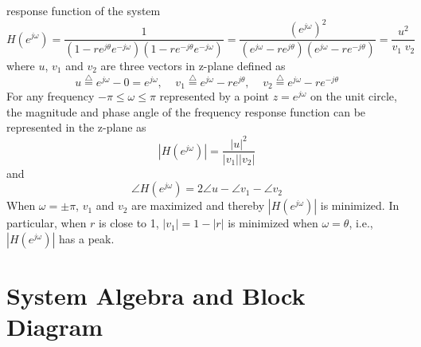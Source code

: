 response function of the system
\[
H(e^{j\omega})=\frac{1}{(1-re^{j\theta}e^{-j\omega})(1-re^{-j\theta}e^{-j\omega})}
=\frac{(e^{j\omega})^2}{(e^{j\omega}-re^{j\theta})(e^{j\omega}-re^{-j\theta})}	
=\frac{u^2}{v_1 \; v_2}	\]
where $u$, $v_1$ and $v_2$ are three vectors in z-plane defined as
\[ 	u\stackrel{\triangle}{=}e^{j\omega}-0=e^{j\omega},
\;\;\;\;v_1\stackrel{\triangle}{=}e^{j\omega}-re^{j\theta},
\;\;\;\;v_2\stackrel{\triangle}{=}e^{j\omega}-re^{-j\theta}
\]
For any frequency $-\pi \le\omega\le\pi$ represented by a point $z=e^{j\omega}$
on the unit circle, the magnitude and phase angle of the frequency response
function can be represented in the z-plane as
\[	|H(e^{j\omega})|=\frac{|u|^2}{|v_1||v_2|}	\]
and
\[	\angle{H(e^{j\omega})}=2\angle u-\angle v_1-\angle v_2	\]
When $\omega=\pm \pi$, $v_1$ and $v_2$ are maximized and thereby 
$|H(e^{j\omega})|$ is minimized. In particular, when $r$ is close to 1, 
$|v_1|=1-|r|$ is minimized when $\omega=\theta$, i.e., $|H(e^{j\omega})|$ 
has a peak.

\newpage
\section*{System Algebra and Block Diagram}

